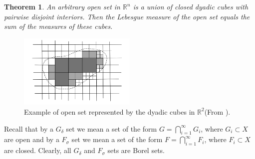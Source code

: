 \documentclass[11pt]{book}
\newtheorem{theorem}{Theorem}[chapter]
\theoremstyle{definition}
\numberwithin{equation}{chapter}
\begin{document}
\medskip

\begin{theorem}\label{theorem_123}
An arbitrary open set in $\mathbb{R}^n$ is a union of closed dyadic cubes with pairwise disjoint interiors. Then the Lebesgue measure of the open set equals the sum of the measures of these cubes.
\end{theorem}
\begin{figure}[H]
    \centering
    \includegraphics[width=0.5\textwidth]{dyadic_cube.png}
    \caption{Example of open set represented by the dyadic cubes in $\mathbb{R}^2$(From \cite{6}).}
    \label{fig:dyadic_cube}
\end{figure}

\medskip

Recall that by a $G_\delta$ set we mean a set of the form $G = \bigcap^\infty_{i=1} G_i$, where $G_i \subset X$ are open and by a $F_\sigma$ set we mean a set of the form $F = \bigcap^\infty_{i=1} F_i$, where $F_i \subset X$ are closed. Clearly, all $G_\delta$ and $F_\sigma$ sets are Borel sets.

\medskip
\end{document}

